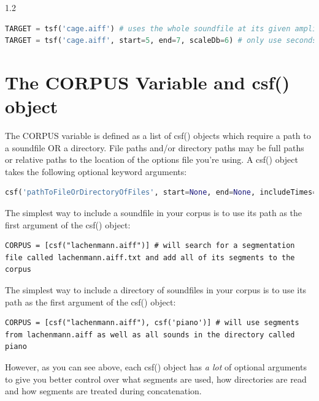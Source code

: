 \documentclass{article}
\begin{document}
\begin{spacing}{1.2}
\begin{lstlisting}[language=python]
TARGET = tsf('cage.aiff') # uses the whole soundfile at its given amplitude
TARGET = tsf('cage.aiff', start=5, end=7, scaleDb=6) # only use seconds 5-7 of cage.aiff at double the amplitude.
\end{lstlisting}


\section{The CORPUS Variable and csf() object}
The CORPUS variable is defined as a list of csf() objects which require a path to a soundfile OR a directory.  File paths and/or directory paths may be full paths or relative paths to the location of the options file you're using.  A csf() object takes the following optional keyword arguments:


\begin{lstlisting}[language=python]
csf('pathToFileOrDirectoryOfFiles', start=None, end=None, includeTimes=[], excludeTimes=[], limit=[], wholeFile=False, recursive=True, includeStr=None, excludeStr=None, scaleDb=0.0, limitDur=None, onsetLen=0.01, offsetLen='30%', postSelectAmpBool=False, postSelectAmpMethod='power-mean-seg', postSelectAmpMin=-12, postSelectAmpMax=+12, midiPitchMethod='composite', transMethod=None,  transQuantize=0, allowRepetition=True, restrictRepetition=0.5, restrictOverlaps=None, restrictInTime=0, scaleDistance=1, superimposeRule=None, segmentationFile=None, segmentationExtension='.txt')
\end{lstlisting}




The simplest way to include a soundfile in your corpus is to use its path as the first argument of the csf() object:
\begin{lstlisting}
CORPUS = [csf("lachenmann.aiff")] # will search for a segmentation file called lachenmann.aiff.txt and add all of its segments to the corpus
\end{lstlisting}

The simplest way to include a directory of soundfiles in your corpus is to use its path as the first argument of the csf() object:
\begin{lstlisting}
CORPUS = [csf("lachenmann.aiff"), csf('piano')] # will use segments from lachenmann.aiff as well as all sounds in the directory called piano
\end{lstlisting}

\noindent However, as you can see above, each csf() object has \emph{a lot} of optional arguments to give you better control over what segments are used, how directories are read and how segments are treated during concatenation.  


\end{spacing}
\end{document}

